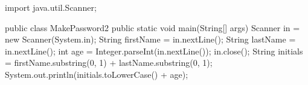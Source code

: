\begin{unipdcode}[language=Java]
import java.util.Scanner;

public class MakePassword2 {
    public static void main(String[] args) {
        Scanner in = new Scanner(System.in);
        String firstName = in.nextLine();
        String lastName = in.nextLine();
        int age = Integer.parseInt(in.nextLine());
        in.close();
        String initials = firstName.substring(0, 1)
                        + lastName.substring(0, 1);
        System.out.println(initials.toLowerCase() + age);
    }
}
\end{unipdcode}
